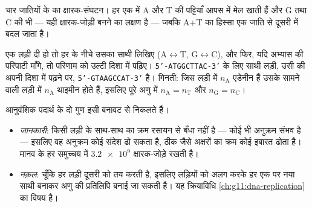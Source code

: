 \begin{omfigure}

{\small चार जातियों के  का क्षारक-संघटन। हर एक में A और T की पट्टियाँ
आपस में मेल खाती हैं और G तथा C की भी --- यही क्षारक-जोड़ी बनने का लक्षण
है --- जबकि A+T का हिस्सा एक जाति से दूसरी में बदल जाता है।}
\end{omfigure}

\begin{method}[पूरक लड़ी लिखना]\label{met:g10:universal-dna:complement}
एक लड़ी दी हो तो हर  के नीचे उसका साथी लिखिए (A$\leftrightarrow$T,
G$\leftrightarrow$C), और फिर, यदि अभ्यास की परिपाटी माँगे, तो परिणाम को
उल्टी दिशा में पढ़िए। \texttt{5'-ATGGCTTAC-3'} के लिए साथी लड़ी, उसी की
अपनी दिशा में पढ़ने पर, \texttt{5'-GTAAGCCAT-3'} है। गिनती: जिस लड़ी में
$n_\mathrm{A}$ एडेनीन हैं उसके सामने वाली लड़ी में $n_\mathrm{A}$ थाइमीन
होते हैं, इसलिए पूरे अणु में $n_\mathrm{A} = n_\mathrm{T}$ और
$n_\mathrm{G} = n_\mathrm{C}$।
\end{method}

\begin{proposition}[बनावट क्या-क्या समझाती है]\label{prop:g10:universal-dna:explains}
आनुवंशिक पदार्थ के दो गुण इसी बनावट से निकलते हैं।
\begin{itemize}
  \item \emph{जानकारी}: किसी लड़ी के साथ-साथ  का क्रम रसायन से
        बँधा नहीं है --- कोई भी अनुक्रम संभव है --- इसलिए वह अनुक्रम कोई
        संदेश ढो सकता है, ठीक जैसे अक्षरों का क्रम कोई इबारत ढोता है।
        मानव   के हर समुच्चय में $\num{3.2e9}$
        क्षारक-जोड़े रखती है।
  \item \emph{नक़ल}: चूँकि हर लड़ी दूसरी को तय करती है, इसलिए लड़ियों को
        अलग करके हर एक पर नया साथी बनाकर अणु की प्रतिलिपि बनाई जा सकती
        है। यह क्रियाविधि \cref{ch:g11:dna-replication} का विषय है।
\end{itemize}
\end{proposition}
\admitted

